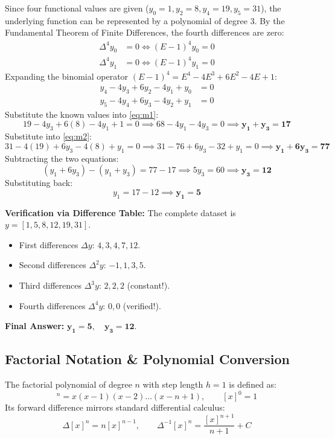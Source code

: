 \documentclass[11pt,a4paper]{article}
\begin{document}
\begin{solbox}
Since four functional values are given ($y_0 = 1, y_2 = 8, y_4 = 19, y_5 = 31$), the underlying function can be represented by a polynomial of degree 3.
By the Fundamental Theorem of Finite Differences, the fourth differences are zero:
\begin{align}
    \Delta^4 y_0 &= 0 \iff (E - 1)^4 y_0 = 0 \label{eq:miss1} \\
    \Delta^4 y_1 &= 0 \iff (E - 1)^4 y_1 = 0 \label{eq:miss2}
\end{align}
Expanding the binomial operator $(E - 1)^4 = E^4 - 4E^3 + 6E^2 - 4E + 1$:
\begin{align}
    y_4 - 4y_3 + 6y_2 - 4y_1 + y_0 &= 0 \label{eq:m1} \\
    y_5 - 4y_4 + 6y_3 - 4y_2 + y_1 &= 0 \label{eq:m2}
\end{align}
Substitute the known values into \eqref{eq:m1}:
$$19 - 4y_3 + 6(8) - 4y_1 + 1 = 0 \implies 68 - 4y_1 - 4y_3 = 0 \implies \mathbf{y_1 + y_3 = 17}$$
Substitute into \eqref{eq:m2}:
$$31 - 4(19) + 6y_3 - 4(8) + y_1 = 0 \implies 31 - 76 + 6y_3 - 32 + y_1 = 0 \implies \mathbf{y_1 + 6y_3 = 77}$$
Subtracting the two equations:
$$(y_1 + 6y_3) - (y_1 + y_3) = 77 - 17 \implies 5y_3 = 60 \implies \mathbf{y_3 = 12}$$
Substituting back:
$$y_1 = 17 - 12 \implies \mathbf{y_1 = 5}$$

\textbf{Verification via Difference Table:}
The complete dataset is $y = [1, 5, 8, 12, 19, 31]$.
\begin{itemize}
    \item First differences $\Delta y$: $4, 3, 4, 7, 12$.
    \item Second differences $\Delta^2 y$: $-1, 1, 3, 5$.
    \item Third differences $\Delta^3 y$: $2, 2, 2$ (constant!).
    \item Fourth differences $\Delta^4 y$: $0, 0$ (verified!).
\end{itemize}
\textbf{Final Answer:} $\mathbf{y_1 = 5, \quad y_3 = 12}$.
\end{solbox}

\subsection{Factorial Notation \& Polynomial Conversion}
\begin{defbox}
The factorial polynomial of degree $n$ with step length $h=1$ is defined as:
\begin{equation}
    [x]^n = x(x - 1)(x - 2)\dots(x - n + 1), \qquad [x]^0 = 1
\end{equation}
Its forward difference mirrors standard differential calculus:
\begin{equation}
    \Delta [x]^n = n [x]^{n-1}, \qquad \Delta^{-1} [x]^n = \frac{[x]^{n+1}}{n+1} + C
\end{equation}
\end{defbox}
\end{document}
